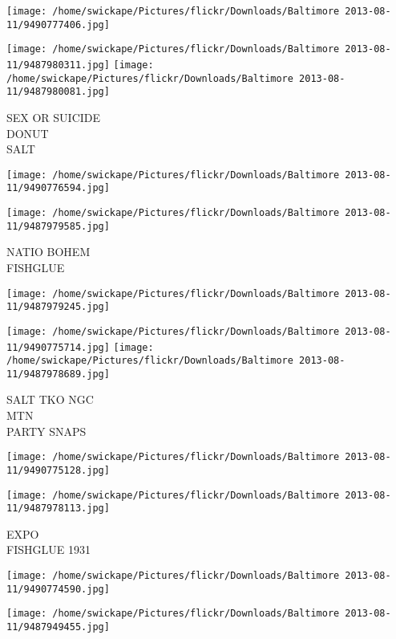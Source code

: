 \documentclass[10pt,letterpaper]{article}
\begin{document}
\texttt{[image: /home/swickape/Pictures/flickr/Downloads/Baltimore 2013-08-11/9490777406.jpg]}

\vspace{0.25in}
\texttt{[image: /home/swickape/Pictures/flickr/Downloads/Baltimore 2013-08-11/9487980311.jpg]}
\texttt{[image: /home/swickape/Pictures/flickr/Downloads/Baltimore 2013-08-11/9487980081.jpg]}

SEX OR SUICIDE\\
DONUT\\
SALT
\pagebreak

\texttt{[image: /home/swickape/Pictures/flickr/Downloads/Baltimore 2013-08-11/9490776594.jpg]}

\vspace{0.25in}
\texttt{[image: /home/swickape/Pictures/flickr/Downloads/Baltimore 2013-08-11/9487979585.jpg]}

NATIO BOHEM\\
FISHGLUE
\pagebreak

\texttt{[image: /home/swickape/Pictures/flickr/Downloads/Baltimore 2013-08-11/9487979245.jpg]}

\vspace{0.25in}
\texttt{[image: /home/swickape/Pictures/flickr/Downloads/Baltimore 2013-08-11/9490775714.jpg]}
\texttt{[image: /home/swickape/Pictures/flickr/Downloads/Baltimore 2013-08-11/9487978689.jpg]}

SALT TKO NGC\\
MTN\\
PARTY SNAPS
\pagebreak

\texttt{[image: /home/swickape/Pictures/flickr/Downloads/Baltimore 2013-08-11/9490775128.jpg]}

\vspace{0.25in}
\texttt{[image: /home/swickape/Pictures/flickr/Downloads/Baltimore 2013-08-11/9487978113.jpg]}

EXPO\\
FISHGLUE 1931
\pagebreak

\texttt{[image: /home/swickape/Pictures/flickr/Downloads/Baltimore 2013-08-11/9490774590.jpg]}

\vspace{0.25in}
\texttt{[image: /home/swickape/Pictures/flickr/Downloads/Baltimore 2013-08-11/9487949455.jpg]}
\end{document}
